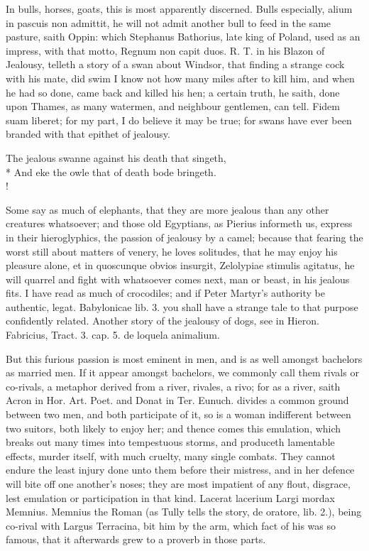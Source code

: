 In bulls, horses, goats, this is most apparently discerned. Bulls
especially, alium in pascuis non admittit, he will not admit another
bull to feed in the same pasture, saith Oppin: which Stephanus
Bathorius, late king of Poland, used as an impress, with that motto,
Regnum non capit duos. R. T. in his Blazon of Jealousy, telleth a story
of a swan about Windsor, that finding a strange cock with his mate, did
swim I know not how many miles after to kill him, and when he had so
done, came back and killed his hen; a certain truth, he saith, done
upon Thames, as many watermen, and neighbour gentlemen, can tell. Fidem
suam liberet; for my part, I do believe it may be true; for swans have
ever been branded with that epithet of jealousy.
%
{\gothfont%
\begin{versewithlinenos}{2}{1}{1}%
The jealous swanne against his death that singeth,\\*
And eke the owle that of death bode bringeth.\\!
\end{versewithlinenos}%
}%

Some say as much of elephants, that they are more jealous than
any other creatures whatsoever; and those old Egyptians, as
Pierius informeth us, express in their hieroglyphics, the passion
of jealousy by a camel; because that fearing the worst still
about matters of venery, he loves solitudes, that he may enjoy his
pleasure alone, et in quoscunque obvios insurgit, Zelolypiae stimulis
agitatus, he will quarrel and fight with whatsoever comes next, man or
beast, in his jealous fits. I have read as much of crocodiles;
and if Peter Martyr's authority be authentic, legat. Babylonicae lib.
3. you shall have a strange tale to that purpose confidently related.
Another story of the jealousy of dogs, see in Hieron. Fabricius, Tract.
3. cap. 5. de loquela animalium.

But this furious passion is most eminent in men, and is as well amongst
bachelors as married men. If it appear amongst bachelors, we commonly
call them rivals or co-rivals, a metaphor derived from a river,
rivales, a rivo; for as a river, saith Acron in Hor. Art. Poet.
and Donat in Ter. Eunuch. divides a common ground between two men, and
both participate of it, so is a woman indifferent between two suitors,
both likely to enjoy her; and thence comes this emulation, which breaks
out many times into tempestuous storms, and produceth lamentable
effects, murder itself, with much cruelty, many single combats. They
cannot endure the least injury done unto them before their mistress,
and in her defence will bite off one another's noses; they are most
impatient of any flout, disgrace, lest emulation or participation in
that kind. Lacerat lacerium Largi mordax Memnius. Memnius the
Roman (as Tully tells the story, de oratore, lib. 2.), being co-rival
with Largus Terracina, bit him by the arm, which fact of his was so
famous, that it afterwards grew to a proverb in those parts.

